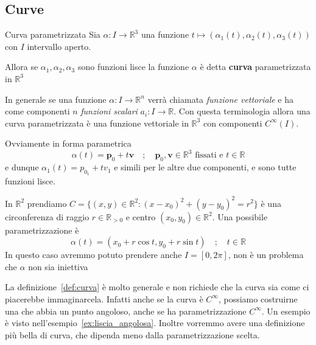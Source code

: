 \subsection{Curve}
\begin{definition}[label=def:curva]{Curva parametrizzata}
    Sia \(\alpha : I \to \mathbb{R}^{3}\) una funzione 
    \(t \mapsto (\alpha_{1}(t), \alpha_{2}(t), \alpha_{3}(t)) \) con \(I\)
    intervallo aperto.
    
    Allora se \(\alpha_{1}, \alpha_{2}, \alpha_{3}\) sono funzioni lisce la
    funzione \(\alpha\) è detta \textbf{curva} parametrizzata in \(\mathbb{R}^3\) 
\end{definition}
In generale se una funzione \(\alpha : I \to \mathbb{R}^{n}\) verrà chiamata
\emph{funzione vettoriale} e ha come componenti \(n\) \emph{funzioni scalari}
\(a_{i} : I \to \mathbb{R}\). Con questa terminologia allora una curva
parametrizzata è una funzione vettoriale in \(\mathbb{R}^{3}\) con componenti
\(C^{\infty}{(I)}\).
\begin{example}\label{ex:retta}
    Ovviamente in forma parametrica
    \[
        \alpha{(t)} = \mathbf{p}_{0} + t\mathbf{v} \quad ; \quad \mathbf{p}_{0},
        \mathbf{v} \in \mathbb{R}^3 \text{ fissati e \(t \in \mathbb{R}\)}
    \]
    e dunque \(\alpha_{1}{(t)} = p_{0_{1}} + t v_{1}\) e simili per le altre due
    componenti, e sono tutte funzioni lisce.
\end{example}
\begin{example}
    In \(\mathbb{R}^{2}\) prendiamo \(C = \{{(x,y)} \in \mathbb{R}^2 :
    {(x-x_{0})}^2 + {(y-y_{0})}^2 = r^2\} \) è una circonferenza di raggio \(r
    \in \mathbb{R}_{> 0} \) e centro \({(x_{0}, y_{0})} \in \mathbb{R}^2\). Una
    possibile parametrizzazione è
    \[
      \alpha{(t)} = (x_{0} + r\cos{t}, y_{0} + r\sin{t}) \quad ; \quad t \in
      \mathbb{R}
    \]
    In questo caso avremmo potuto prendere anche \(I = [0, 2\pi]\), non è un
    problema che \(\alpha\) non sia iniettiva
\end{example}

La definizione~\ref{def:curva} è molto generale e non richiede che la curva sia
come ci piacerebbe immaginarcela. Infatti anche se la curva è \(C^{\infty}\),
possiamo costruirne una che abbia un punto angoloso, anche se ha
parametrizzazione \(C^{\infty}\). Un esempio è visto
nell'esempio~\ref{ex:liscia_angolosa}. Inoltre vorremmo avere una definizione
più bella di curva, che dipenda meno dalla parametrizzazione scelta.

